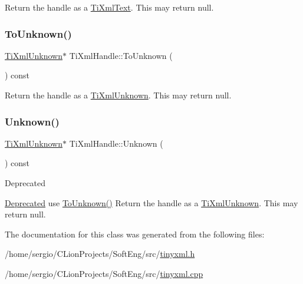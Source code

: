 Return the handle as a \hyperlink{class_ti_xml_text}{Ti\+Xml\+Text}. This may return null. \mbox{\label{class_ti_xml_handle_a450ec91dac1ded02d72eb918d062ad31}} 
\subsubsection{\texorpdfstring{To\+Unknown()}{ToUnknown()}}
{\footnotesize\ttfamily \hyperlink{class_ti_xml_unknown}{Ti\+Xml\+Unknown}$\ast$ Ti\+Xml\+Handle\+::\+To\+Unknown (\begin{DoxyParamCaption}{ }\end{DoxyParamCaption}) const\hspace{0.3cm}{\ttfamily [inline]}}

Return the handle as a \hyperlink{class_ti_xml_unknown}{Ti\+Xml\+Unknown}. This may return null. \mbox{\label{class_ti_xml_handle_a12b32f098c7daa5facbc04e9618262c5}} 
\subsubsection{\texorpdfstring{Unknown()}{Unknown()}}
{\footnotesize\ttfamily \hyperlink{class_ti_xml_unknown}{Ti\+Xml\+Unknown}$\ast$ Ti\+Xml\+Handle\+::\+Unknown (\begin{DoxyParamCaption}{ }\end{DoxyParamCaption}) const\hspace{0.3cm}{\ttfamily [inline]}}

\begin{DoxyRefDesc}{Deprecated}
\item[\hyperlink{deprecated__deprecated000004}{Deprecated}]use \hyperlink{class_ti_xml_handle_a450ec91dac1ded02d72eb918d062ad31}{To\+Unknown()} Return the handle as a \hyperlink{class_ti_xml_unknown}{Ti\+Xml\+Unknown}. This may return null. \end{DoxyRefDesc}


The documentation for this class was generated from the following files\+:\begin{DoxyCompactItemize}
\item 
/home/sergio/\+C\+Lion\+Projects/\+Soft\+Eng/src/\hyperlink{tinyxml_8h}{tinyxml.\+h}\item 
/home/sergio/\+C\+Lion\+Projects/\+Soft\+Eng/src/\hyperlink{tinyxml_8cpp}{tinyxml.\+cpp}\end{DoxyCompactItemize}

